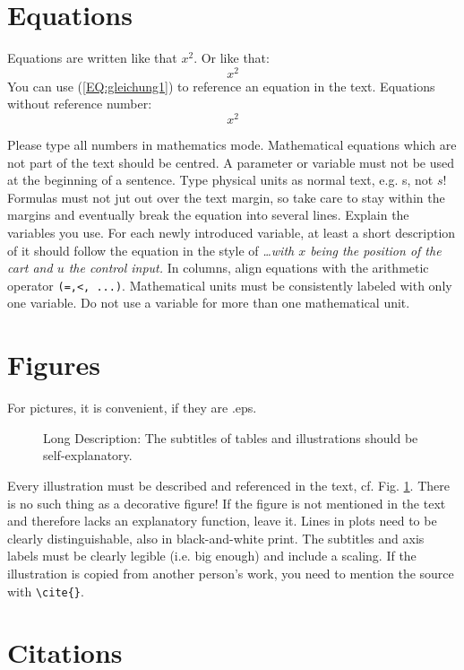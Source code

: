\documentclass[a4paper,twoside, openright,12pt]{report}
\begin{document}
\section{Equations}
Equations are written like that $x^2$. Or like that:
\begin{equation}
x^2
\label{EQ:gleichung1}
\end{equation}
You can use (\ref{EQ:gleichung1}) to reference an equation in the
text. Equations without reference number:
\[
x^2
\]

Please type all numbers in mathematics mode.
Mathematical equations which are not part of the text should be centred.
A parameter or variable must not be used at the beginning of a sentence.
Type physical units as normal text, e.g. s, not $s$!
Formulas must not jut out over the text margin, so take care to stay within the margins and eventually break the equation into several lines.
Explain the variables you use. For each newly introduced variable, at least a short description of it should follow the equation in the style of \emph{\ldots with $x$ being the position of the cart and $u$ the control input.}
In columns, align equations with the arithmetic operator \verb|(=,<, ...)|.
Mathematical units must be consistently labeled with only one variable. Do not
use a variable for more than one mathematical unit.

\section{Figures}

For pictures, it is convenient, if they are .eps.
\begin{figure}[htb]
\centering
\caption[Abbreviated Description]{Long Description: The subtitles of tables and illustrations should be self-explanatory.}
\label{FIG:abb1}
\end{figure}

Every illustration must be described and referenced in the text, cf. Fig. \ref{FIG:abb1}. 
There is no such thing as a decorative figure! 
If the figure is not mentioned in the text and therefore lacks an explanatory function, leave it.
Lines in plots need to be clearly distinguishable, also in black-and-white print. 
The subtitles and axis labels must be clearly legible (i.e. big enough) and include a scaling.
If the illustration is copied from another person's work, you need to mention the
source with \verb|\cite{}|.

\section{Citations}
\end{document}
